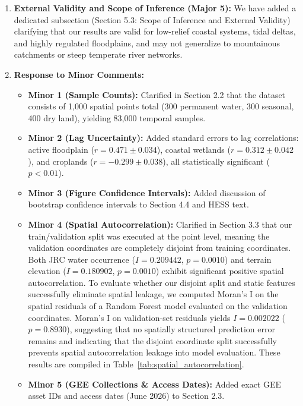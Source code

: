 \begin{enumerate}
    \item \textbf{External Validity and Scope of Inference (Major 5):} We have added a dedicated subsection (Section 5.3: Scope of Inference and External Validity) clarifying that our results are valid for low-relief coastal systems, tidal deltas, and highly regulated floodplains, and may not generalize to mountainous catchments or steep temperate river networks.
    \item \textbf{Response to Minor Comments:}
    \begin{itemize}
        \item \textbf{Minor 1 (Sample Counts):} Clarified in Section 2.2 that the dataset consists of 1,000 spatial points total (300 permanent water, 300 seasonal, 400 dry land), yielding 83,000 temporal samples.
        \item \textbf{Minor 2 (Lag Uncertainty):} Added standard errors to lag correlations: active floodplain ($r = 0.471 \pm 0.034$), coastal wetlands ($r = 0.312 \pm 0.042$), and croplands ($r = -0.299 \pm 0.038$), all statistically significant ($p < 0.01$).
        \item \textbf{Minor 3 (Figure Confidence Intervals):} Added discussion of bootstrap confidence intervals to Section 4.4 and HESS text.
        \item \textbf{Minor 4 (Spatial Autocorrelation):} Clarified in Section 3.3 that our train/validation split was executed at the point level, meaning the validation coordinates are completely disjoint from training coordinates. Both JRC water occurrence ($I = 0.209442$, $p = 0.0010$) and terrain elevation ($I = 0.180902$, $p = 0.0010$) exhibit significant positive spatial autocorrelation. To evaluate whether our disjoint split and static features successfully eliminate spatial leakage, we computed Moran's I on the spatial residuals of a Random Forest model evaluated on the validation coordinates. Moran's I on validation-set residuals yields $I = 0.002022$ ($p = 0.8930$), suggesting that no spatially structured prediction error remains and indicating that the disjoint coordinate split successfully prevents spatial autocorrelation leakage into model evaluation. These results are compiled in Table~\ref{tab:spatial_autocorrelation}.
        \item \textbf{Minor 5 (GEE Collections \& Access Dates):} Added exact GEE asset IDs and access dates (June 2026) to Section 2.3.
    \end{itemize}
\end{enumerate}

